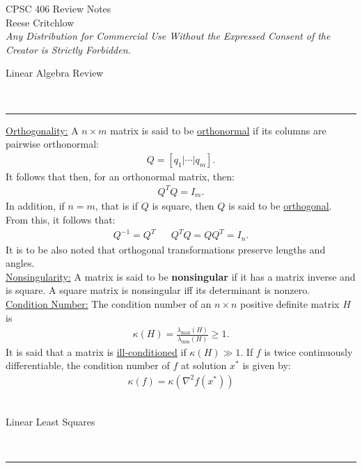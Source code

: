 \documentclass{article}
\newcommand{\header}[1]{\begin{large}\noindent #1\end{large}\\\rule{\textwidth}{0.5pt}}
\newcommand{\sheader}[1]{\underline{#1:}}
\newcommand{\gap}{\medskip\\}
\begin{document}
\begin{center}
        \Large CPSC 406 Review Notes\\
        \normalsize Reese Critchlow\\
        \textit{Any Distribution for Commercial Use Without the Expressed Consent of the Creator is Strictly Forbidden.}
\end{center}

\header{Linear Algebra Review}
\sheader{Orthogonality} A $n \times m$ matrix is said to be \underline{orthonormal} if its columns are pairwise orthonormal:
\begin{align*}
    Q = [q_1 | \cdots | q_m].
\end{align*}
It follows that then, for an orthonormal matrix, then:
\begin{align*}
    Q^TQ = I_m.
\end{align*}
In addition, if $n = m$, that is if $Q$ is square, then $Q$ is said to be \underline{orthogonal}.
From this, it follows that:
\begin{align*}
    Q^{-1} = Q^T && Q^TQ = QQ^T = I_n.
\end{align*}
It is to be also noted that orthogonal transformations preserve lengths and angles.
\gap
\sheader{Nonsingularity} A matrix is said to be \textbf{nonsingular} if it has a matrix inverse and 
is square. A square matrix is nonsingular iff its determinant is nonzero.
\gap
\sheader{Condition Number} The condition number of an $n \times n$ positive definite matrix
$H$ is 
\begin{align*}
    \kappa(H) = \frac{\lambda_{\max} (H)}{\lambda_{\min} (H)} \geq 1.
\end{align*}
It is said that a matrix is \underline{ill-conditioned} if $\kappa(H) \gg 1$. If $f$
is twice continuously differentiable, the condition number of $f$ at solution $x^*$ is 
given by:
\begin{align*}
    \kappa(f) = \kappa(\nabla^2 f(x^*))
\end{align*}
\gap
\header{Linear Least Squares}
\end{document}
